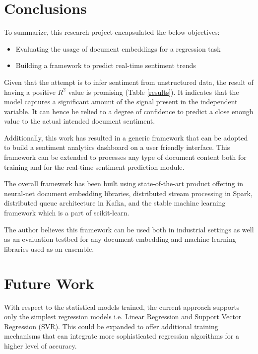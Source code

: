\documentclass[conference]{IEEEtran}
\begin{document}
\vspace{5mm}

\section{Conclusions}
    To summarize, this research project encapsulated the below objectives:
    \begin{itemize}
        \item Evaluating the usage of document embeddings for a regression task
        \item Building a framework to predict real-time sentiment trends
    \end{itemize}

    Given that the attempt is to infer sentiment from unstructured data, the result of having a positive $R^2$ value is promising (Table \ref{results}).
    It indicates that the model captures a significant amount of the signal present in the independent variable.
    It can hence be relied to a degree of confidence to predict a close enough value to the actual intended document sentiment.

    Additionally, this work has resulted in a generic framework that can be adopted to build a sentiment analytics dashboard on a user friendly interface. 
    This framework can be extended to processes any type of document content both for training and for the real-time sentiment prediction module.

    The overall framework has been built using state-of-the-art product offering in neural-net document embedding libraries, distributed stream processing in Spark, distributed queue architecture in Kafka, and the stable machine learning framework which is a part of scikit-learn. 

    The author believes this framework can be used both in industrial settings as well as an evaluation testbed for any document embedding and machine learning libraries used as an ensemble.

\vspace{5mm}

\section{Future Work}
    With respect to the statistical models trained, the current approach supports only the simplest regression models i.e. Linear Regression and Support Vector Regression (SVR). 
    This could be expanded to offer additional training mechanisms that can integrate more sophisticated regression algorithms for a higher level of accuracy.
     
\end{document}

